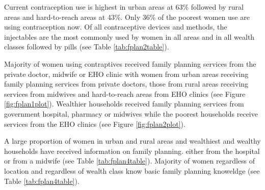 \documentclass[12pt,a4paper]{article}
\begin{document}
Current contraception use is highest in urban areas at 63\% followed by rural areas and hard-to-reach areas at 43\%. Only 36\% of the poorest women use are using contraception now. Of all contraceptive devices and methods, the injectables are the most commonly used by women in all areas and in all wealth classes followed by pills (see Table \ref{tab:fplan2table}).

Majority of women using contraptives received family planning services from the private doctor, midwife or EHO clinic with women from urban areas receiving family planning services from private doctors, those from rural areas receiving services from midwives and hard-to-reach areas from EHO clinics (see Figure \ref{fig:fplan1plot}). Wealthier households received family planning services from government hospital, pharmacy or midwives while the poorest households receive services from the EHO clinics (see Figure \ref{fig:fplan2plot}).

A large proportion of women in urban and rural areas and wealthiest and wealthy households have received information on family planning. either from the hospital or from a midwife (see Table \ref{tab:fplan4table}). Majority of women regardless of location and regardless of wealth class know basic family planning knoweldge (see Table \ref{tab:fplan4table}).
\end{document}

